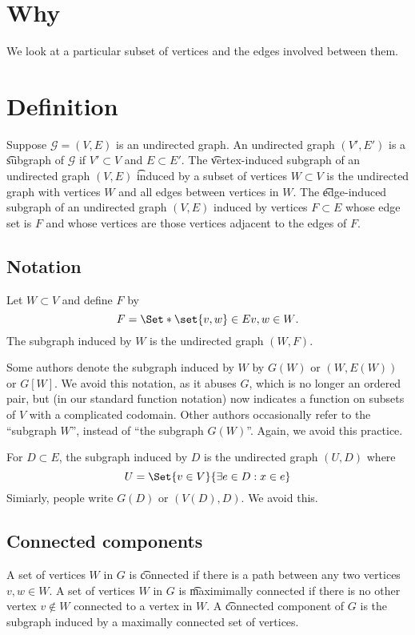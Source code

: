 

\section*{Why}

We look at a particular subset of vertices and the edges involved between them.

\section*{Definition}

Suppose $\mathcal{G}  = (V, E)$ is an undirected graph.
An undirected graph $(V', E')$ is a \t{subgraph} of $\mathcal{G} $ if $V' \subset V$ and $E \subset E'$.
The \t{vertex-induced subgraph} of an undirected graph $(V, E)$ \t{induced by} a subset of vertices $W \subset V$ is the undirected graph with vertices $W$ and all edges between vertices in $W$.
The \t{edge-induced subgraph} of an undirected graph $(V, E)$ induced by vertices $F \subset E$ whose edge set is $F$ and whose vertices are those vertices adjacent to the edges of $F$.

\subsection*{Notation}

Let $W \subset V$ and define $F$ by
\[
F = \Set*{\set{v, w} \in E}{v, w \in W}.
\]
The subgraph induced by $W$ is the undirected graph $(W, F)$.

Some authors denote the subgraph induced by $W$ by $G(W)$ or $(W, E(W))$ or $G[W]$.
We avoid this notation, as it abuses $G$, which is no longer an ordered pair, but (in our standard function notation) now indicates a function on subsets of $V$ with a complicated codomain.
Other authors occasionally refer to the ``subgraph $W$'', instead of ``the subgraph $G(W)$''.
Again, we avoid this practice.

For $D \subset E$, the subgraph induced by $D$ is the undirected graph $(U, D)$ where
\[
U = \Set{v \in V}{\exists e \in D: x \in e}
\]
Simiarly, people write $G(D)$ or $(V(D), D)$.
We avoid this.

\subsection*{Connected components}

A set of vertices $W$ in $G$ is \t{connected} if there is a path between any two vertices $v, w \in W$.
A set of vertices $W$ in $G$ is \t{maximimally connected} if there is no other vertex $v \not \in W$ connected to a vertex in $W$.
A \t{connected component} of $G$ is the subgraph induced by a maximally connected set of vertices.

